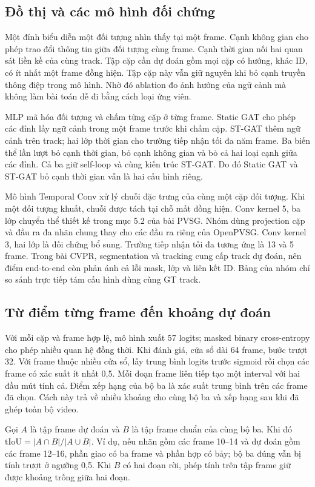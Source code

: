 \subsection{Đồ thị và các mô hình đối chứng}
Một đỉnh biểu diễn một đối tượng nhìn thấy tại một frame. Cạnh không gian
cho phép trao đổi thông tin giữa đối tượng cùng frame. Cạnh thời gian nối hai
quan sát liền kề của cùng track. Tập cặp cần dự đoán gồm mọi cặp có hướng,
khác ID, có ít nhất một frame đồng hiện. Tập cặp này vẫn giữ nguyên khi bỏ
cạnh truyền thông điệp trong mô hình. Nhờ đó ablation đo ảnh hưởng của ngữ
cảnh mà không làm bài toán dễ đi bằng cách loại ứng viên.

MLP mã hóa đối tượng và chấm từng cặp ở từng frame. Static GAT cho phép các
đỉnh lấy ngữ cảnh trong một frame trước khi chấm cặp. ST-GAT thêm ngữ cảnh
trên track; hai lớp thời gian cho trường tiếp nhận tối đa năm frame.
Ba biến thể lần lượt bỏ cạnh thời gian, bỏ cạnh không gian và bỏ cả hai loại
cạnh giữa các đỉnh. Cả ba giữ self-loop và cùng kiến trúc ST-GAT. Do đó Static
GAT và ST-GAT bỏ cạnh thời gian vẫn là hai cấu hình riêng.

Mô hình Temporal Conv xử lý chuỗi đặc trưng của cùng một cặp đối tượng. Khi một
đối tượng khuất, chuỗi được tách tại chỗ mất đồng hiện. Conv kernel 5, ba lớp
chuyển thể thiết kế trong mục 5.2 của bài PVSG. Nhóm dùng projection cặp và
đầu ra đa nhãn chung thay cho các đầu ra riêng của OpenPVSG. Conv kernel 3,
hai lớp là đối chứng bổ sung. Trường tiếp nhận tối đa tương ứng là 13 và 5 frame.
Trong bài CVPR, segmentation và tracking cung cấp track dự đoán, nên điểm
end-to-end còn phản ánh cả lỗi mask, lớp và liên kết ID. Bảng của nhóm chỉ so
sánh trực tiếp tám cấu hình dùng cùng GT track.

\subsection{Từ điểm từng frame đến khoảng dự đoán}
Với mỗi cặp và frame hợp lệ, mô hình xuất 57 logits; masked binary
cross-entropy cho phép nhiều quan hệ đồng thời. Khi đánh giá, cửa sổ dài 64
frame, bước trượt 32. Với frame thuộc nhiều cửa sổ, lấy trung bình logits
trước sigmoid rồi chọn các frame có xác suất ít nhất 0,5. Mỗi đoạn frame liên
tiếp tạo một interval với hai đầu mút tính cả. Điểm xếp hạng của bộ ba là xác
suất trung bình trên các frame đã chọn. Cách này trả về nhiều khoảng cho cùng
bộ ba và xếp hạng sau khi đã ghép toàn bộ video.

Gọi $A$ là tập frame dự đoán và $B$ là tập frame chuẩn của cùng bộ ba.
Khi đó $\mathrm{tIoU}=|A\cap B|/|A\cup B|$. Ví dụ, nếu nhãn gồm các
frame 10--14 và dự đoán gồm các frame 12--16, phần giao có ba frame và
phần hợp có bảy; bộ ba đúng vẫn bị tính trượt ở ngưỡng 0,5. Khi $B$ có hai
đoạn rời, phép tính trên tập frame giữ được khoảng trống giữa hai đoạn.


